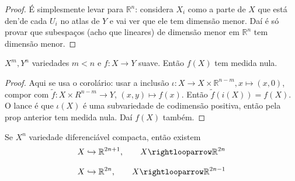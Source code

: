 \begin{proof}\leavevmode
É simplesmente levar para \(\mathbb{R}^n\): considera \(X_i\) como a parte de \(X\) que está den'de cada  \(U_i\) no atlas de \(Y\) e vai ver que ele tem dimensão menor. Daí é só provar que subespaços (acho que lineares) de dimensão menor em \(\mathbb{R}^n\) tem dimensão menor.
\end{proof}

\begin{coro}[Minisard]\leavevmode
\(X^m,Y^n\) variedades \(m<n\)  e \(f:X \to Y\) suave. Então \(f(X)\) tem medida nula.
\end{coro}

\begin{proof}\leavevmode
Aqui se usa o corolário: usar a inclusão \(\iota:X \to X \times \mathbb{R}^{n-m},x \mapsto (x,0)\), compor com \(\tilde{f}:X \times R^{n-m}\to Y\), \((x,y) \mapsto  f(x)\). Então \(\tilde{f}(i(X))=f(X)\). O lance é que \(\iota(X)\) é uma subvariedade de codimensão positiva, então pela prop anterior tem medida nula. Daí $f(X)$ também.
\end{proof}

\begin{coro}\leavevmode
	Se \(X^n\) variedade diferenciável compacta, então existem 
	\[X \hookrightarrow \mathbb{R}^{2n+1},\qquad  X\rightlooparrow \mathbb{R}^{2n}\]
\end{coro}

\begin{thm}\leavevmode
\[X \hookrightarrow \mathbb{R}^{2n},\qquad  X\rightlooparrow \mathbb{R}^{2n-1}\]
\end{thm}


